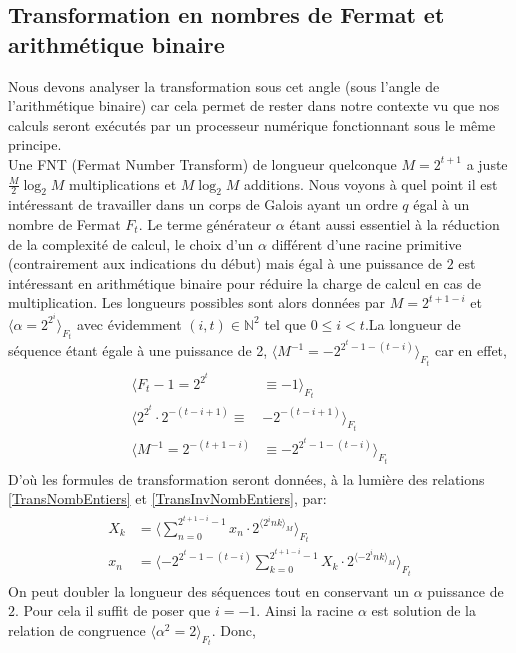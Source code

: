 \subsection{Transformation en nombres de Fermat et arithmétique binaire}\label{MetALPHA}
Nous devons analyser la transformation sous cet angle (sous l'angle de l'arithmétique binaire) car cela permet de rester dans notre contexte vu que nos calculs seront exécutés par un processeur numérique fonctionnant sous le même principe.\\
Une FNT (Fermat Number Transform) de longueur quelconque $ M = 2^{t+1} $ a juste $ \frac{M}{2}\log_{2}M $ multiplications et $ M\log_{2}M $ additions. Nous voyons à quel point il est intéressant de travailler dans un corps de Galois ayant un ordre $ q $ égal à un nombre de Fermat $ F_{t} $. Le terme générateur $ \alpha $ étant aussi essentiel à la réduction de la complexité de calcul, le choix d'un $ \alpha $ différent d'une racine primitive (contrairement aux indications du début) mais égal à une puissance de $ 2 $ est intéressant en arithmétique binaire pour réduire la charge de calcul en cas de multiplication. Les longueurs possibles sont alors données par $ M = 2^{t+1-i} $ et $ \langle\alpha = 2^{2^{i}}\rangle_{F_{t}} $ avec évidemment $ (i,t)\in\mathbb{N}^{2} $ tel que $ 0\leqslant i<t $.La longueur de séquence étant égale à une puissance de 2, $ \langle M^{-1} = -2^{2^{t}-1-(t-i)}\rangle_{F_{t}} $ car en effet,
\begin{eqnarray}
\begin{aligned}
\langle F_{t}-1 = 2^{2^{t}} & \equiv  -1\rangle_{F_{t}}\\
\langle 2^{2^{t}}\cdot 2^{-(t-i+1)}  \equiv & -2^{-(t-i+1)}\rangle_{F_{t}}\\
\langle M^{-1} = 2^{-(t+1-i)} & \equiv  -2^{2^{t}-1-(t-i)}\rangle_{F_{t}}
\end{aligned}
\end{eqnarray}
D'où les formules de transformation seront données, à la lumière des relations \ref{TransNombEntiers} et \ref{TransInvNombEntiers}, par:
\begin{eqnarray}
\begin{aligned}
X_{k} &= \langle\sum_{n=0}^{2^{t+1-i}-1}x_{n}\cdot 2^{\langle 2^{i}nk\rangle_{M}}\rangle_{F_{t}}\\
x_{n} &= \langle -2^{2^{t}-1-(t-i)}\sum_{k=0}^{2^{t+1-i}-1}X_{k}\cdot 2^{\langle -2^{i}nk\rangle_{M}}\rangle_{F_{t}}
\end{aligned}
\end{eqnarray}
On peut doubler la longueur des séquences tout en conservant un $ \alpha $ puissance de $ 2 $. Pour cela il suffit de poser que $ i = -1 $. Ainsi la racine $ \alpha $ est solution de la relation de congruence $ \langle\alpha^{2} = 2\rangle_{F_{t}} $. Donc,
